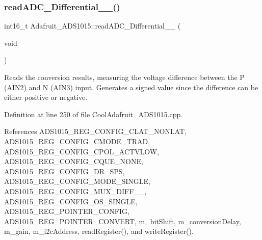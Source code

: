 \subsubsection{\texorpdfstring{read\+A\+D\+C\+\_\+\+Differential\+\_\+\_()}{readADC\_Differential\_2\_3()}}
{\footnotesize\ttfamily int16\+\_\+t Adafruit\+\_\+\+A\+D\+S1015\+::read\+A\+D\+C\+\_\+\+Differential\+\_\+\_ (\begin{DoxyParamCaption}\item[{void}]{ }\end{DoxyParamCaption})}



Reads the conversion results, measuring the voltage difference between the P (A\+I\+N2) and N (A\+I\+N3) input. Generates a signed value since the difference can be either positive or negative. 



Definition at line 250 of file Cool\+Adafruit\+\_\+\+A\+D\+S1015.\+cpp.



References A\+D\+S1015\+\_\+\+R\+E\+G\+\_\+\+C\+O\+N\+F\+I\+G\+\_\+\+C\+L\+A\+T\+\_\+\+N\+O\+N\+L\+AT, A\+D\+S1015\+\_\+\+R\+E\+G\+\_\+\+C\+O\+N\+F\+I\+G\+\_\+\+C\+M\+O\+D\+E\+\_\+\+T\+R\+AD, A\+D\+S1015\+\_\+\+R\+E\+G\+\_\+\+C\+O\+N\+F\+I\+G\+\_\+\+C\+P\+O\+L\+\_\+\+A\+C\+T\+V\+L\+OW, A\+D\+S1015\+\_\+\+R\+E\+G\+\_\+\+C\+O\+N\+F\+I\+G\+\_\+\+C\+Q\+U\+E\+\_\+\+N\+O\+NE, A\+D\+S1015\+\_\+\+R\+E\+G\+\_\+\+C\+O\+N\+F\+I\+G\+\_\+\+D\+R\+\_\+S\+PS, A\+D\+S1015\+\_\+\+R\+E\+G\+\_\+\+C\+O\+N\+F\+I\+G\+\_\+\+M\+O\+D\+E\+\_\+\+S\+I\+N\+G\+LE, A\+D\+S1015\+\_\+\+R\+E\+G\+\_\+\+C\+O\+N\+F\+I\+G\+\_\+\+M\+U\+X\+\_\+\+D\+I\+F\+F\+\_\+\_, A\+D\+S1015\+\_\+\+R\+E\+G\+\_\+\+C\+O\+N\+F\+I\+G\+\_\+\+O\+S\+\_\+\+S\+I\+N\+G\+LE, A\+D\+S1015\+\_\+\+R\+E\+G\+\_\+\+P\+O\+I\+N\+T\+E\+R\+\_\+\+C\+O\+N\+F\+IG, A\+D\+S1015\+\_\+\+R\+E\+G\+\_\+\+P\+O\+I\+N\+T\+E\+R\+\_\+\+C\+O\+N\+V\+E\+RT, m\+\_\+bit\+Shift, m\+\_\+conversion\+Delay, m\+\_\+gain, m\+\_\+i2c\+Address, read\+Register(), and write\+Register().

